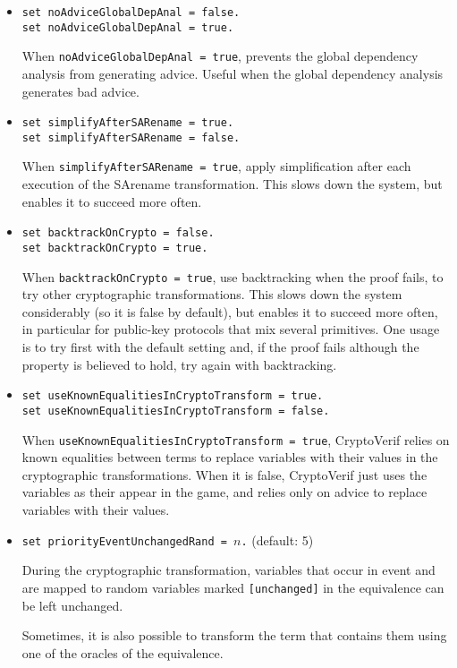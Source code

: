 \begin{itemize}
\begin{itemize}
\item \texttt{set noAdviceGlobalDepAnal = false.}\\
\texttt{set noAdviceGlobalDepAnal = true.}

When \texttt{noAdviceGlobalDepAnal = true}, prevents the global
dependency analysis from generating advice. Useful when the global
dependency analysis generates bad advice.

\item \texttt{set simplifyAfterSARename = true.}\\
\texttt{set simplifyAfterSARename = false.}

When \texttt{simplifyAfterSARename = true}, apply simplification after
each execution of the SArename transformation. This slows down
the system, but enables it to succeed more often.

\item \texttt{set backtrackOnCrypto = false.}\\
\texttt{set backtrackOnCrypto = true.}

When \texttt{backtrackOnCrypto = true}, use backtracking when the proof
fails, to try other cryptographic transformations. This slows down
the system considerably (so it is false by default), but enables
it to succeed more often, in particular for public-key protocols
that mix several primitives. One usage is to try first with the default
setting and, if the proof fails although the property
is believed to hold, try again with backtracking.

\item \texttt{set useKnownEqualitiesInCryptoTransform = true.}\\
\texttt{set useKnownEqualitiesInCryptoTransform = false.}

When \texttt{useKnownEqualitiesInCryptoTransform = true}, CryptoVerif
relies on known equalities between terms to replace variables with
their values in the cryptographic transformations.
When it is false, CryptoVerif just uses the variables as their
appear in the game, and relies only on advice to replace variables
with their values. 

\item \texttt{set priorityEventUnchangedRand = $n$.} (default: 5)

During the cryptographic transformation, variables that occur in event
and are mapped to random variables marked \texttt{[unchanged]} in the
equivalence can be left unchanged.

Sometimes, it is also possible to transform the term that contains
them using one of the oracles of the equivalence.


\end{itemize}
\end{itemize}
